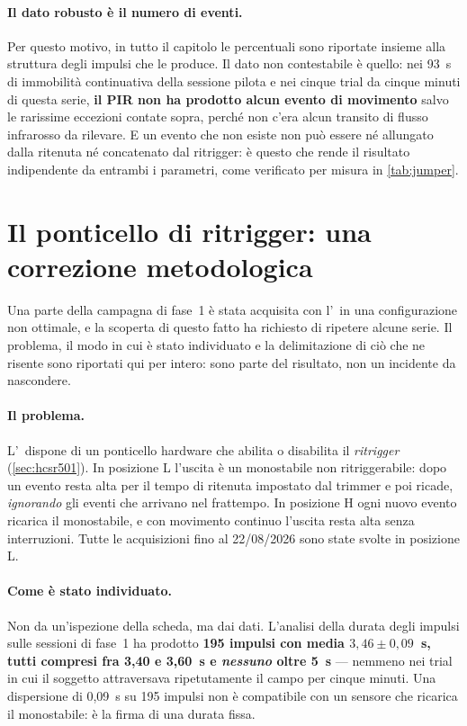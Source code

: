 \paragraph{Il dato robusto è il numero di eventi.} Per questo motivo, in tutto il
capitolo le percentuali sono riportate insieme alla struttura degli impulsi che le
produce. Il dato non contestabile è quello: nei 93~s di immobilità continuativa della
sessione pilota e nei cinque trial da cinque minuti di questa serie, \textbf{il PIR
non ha prodotto alcun evento di movimento} salvo le rarissime eccezioni contate sopra,
perché non c'era alcun transito di flusso infrarosso da rilevare. E un evento che non
esiste non può essere né allungato dalla ritenuta né concatenato dal ritrigger: è
questo che rende il risultato indipendente da entrambi i parametri, come verificato
per misura in \cref{tab:jumper}.

\section{Il ponticello di ritrigger: una correzione metodologica}
\label{sec:jumper}

Una parte della campagna di fase~1 è stata acquisita con l'\pir\ in una
configurazione non ottimale, e la scoperta di questo fatto ha richiesto di ripetere
alcune serie. Il problema, il modo in cui è stato individuato e la delimitazione di
ciò che ne risente sono riportati qui per intero: sono parte del risultato, non un
incidente da nascondere.

\paragraph{Il problema.} L'\pir\ dispone di un ponticello hardware che abilita o
disabilita il \emph{ritrigger} (\cref{sec:hcsr501}). In posizione L l'uscita è un
monostabile non ritriggerabile: dopo un evento resta alta per il tempo di ritenuta
impostato dal trimmer e poi ricade, \emph{ignorando} gli eventi che arrivano nel
frattempo. In posizione H ogni nuovo evento ricarica il monostabile, e con movimento
continuo l'uscita resta alta senza interruzioni. Tutte le acquisizioni fino al
22/08/2026 sono state svolte in posizione L.

\paragraph{Come è stato individuato.} Non da un'ispezione della scheda, ma dai dati.
L'analisi della durata degli impulsi sulle sessioni di fase~1 ha prodotto
\textbf{195 impulsi con media $3{,}46 \pm 0{,}09$~s, tutti compresi fra 3,40 e
3,60~s e \emph{nessuno} oltre 5~s} --- nemmeno nei trial in cui il soggetto
attraversava ripetutamente il campo per cinque minuti. Una dispersione di 0,09~s su
195 impulsi non è compatibile con un sensore che ricarica il monostabile: è la firma
di una durata fissa.

